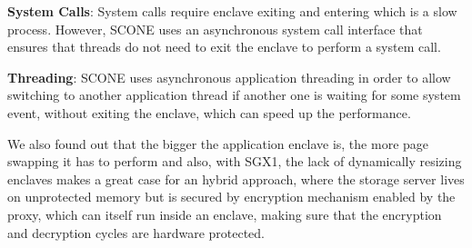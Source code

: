 \textbf{System Calls}: System calls require enclave exiting and entering which is a slow process. However, SCONE uses an asynchronous system call interface that ensures that threads do not need to exit the enclave to perform a system call.

\textbf{Threading}: SCONE uses asynchronous application threading in order to allow switching to another application thread if another one is waiting for some system event, without exiting the enclave, which can speed up the performance.

We also found out that the bigger the application enclave is, the more page swapping it has to perform and also, with \gls{SGX}1, the lack of dynamically resizing enclaves makes a great case for an hybrid approach, where the storage server lives on unprotected memory but is secured by encryption mechanism enabled by the proxy, which can itself run inside an enclave, making sure that the encryption and decryption cycles are hardware protected.

